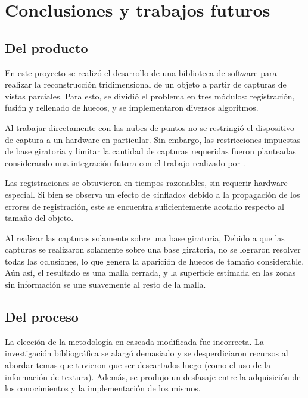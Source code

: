 \chapter{Conclusiones y trabajos futuros}

\section{Del producto}
	En este proyecto se realizó el desarrollo de una biblioteca de software para
	realizar la reconstrucción tridimensional de un objeto a partir de capturas de
	vistas parciales.
	Para esto, se dividió el problema en tres módulos: registración, fusión y
	rellenado de huecos, y se implementaron diversos algoritmos.

	Al trabajar directamente con las nubes de puntos no se restringió el
	dispositivo de captura a un hardware en particular. Sin embargo, las
	restricciones impuestas de base giratoria y limitar la cantidad de capturas
	requeridas fueron planteadas considerando una integración futura con
	el trabajo realizado por \cite{Pancho}.

	Las registraciones se obtuvieron en tiempos razonables, sin requerir hardware especial.
	Si bien se observa un efecto de «inflado» debido a la propagación de los errores de registración,
	este se encuentra suficientemente acotado respecto al tamaño del objeto.

	Al realizar las capturas solamente sobre una base giratoria,
	Debido a que las capturas se realizaron solamente sobre una base giratoria,
	no se lograron resolver todas las oclusiones, lo que genera la aparición de huecos de
	tamaño considerable.
	Aún así, el resultado es una malla cerrada, y la
	superficie estimada en las zonas sin información se une suavemente al resto de
	la malla.

\section{Del proceso}
La elección de la metodología en cascada modificada fue incorrecta.
La investigación bibliográfica se alargó demasiado y se desperdiciaron recursos
al abordar temas que tuvieron que ser descartados luego (como el uso de la
información de textura).
Además, se produjo un desfasaje entre la adquisición de los conocimientos y la
implementación de los mismos.

